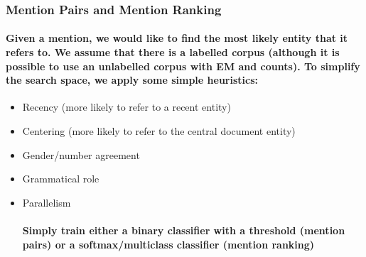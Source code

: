 \documentclass[]{article}
\begin{document}
\subsubsection{Mention Pairs and Mention Ranking}
\paragraph{Given a mention, we would like to find the most likely entity that it refers to. We assume that there is a labelled corpus (although it is possible to use an unlabelled corpus with EM and counts). To simplify the search space, we apply some simple heuristics:}
\begin{itemize}
	\item Recency (more likely to refer to a recent entity)
	\item Centering (more likely to refer to the central document entity)
	\item Gender/number agreement
	\item Grammatical role
	\item Parallelism
	
\paragraph{Simply train either a binary classifier with a threshold (mention pairs) or a softmax/multiclass classifier (mention ranking)}
\end{itemize}
\end{document}

